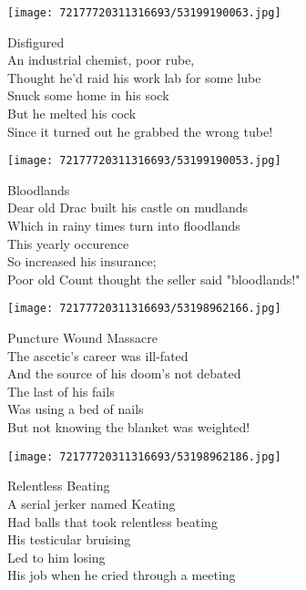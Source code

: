 \documentclass[10pt,letterpaper]{article}
\begin{document}
\begin{center}\texttt{[image: 72177720311316693/53199190063.jpg]}
\end{center}
\begin{center}
Disfigured\\
\vskip 0.2in
An industrial chemist, poor rube,\\
Thought he'd raid his work lab for some lube\\
Snuck some home in his sock\\
But he melted his cock\\
Since it turned out he grabbed the wrong tube!\\
\end{center}
\pagebreak

\begin{center}\texttt{[image: 72177720311316693/53199190053.jpg]}
\end{center}
\begin{center}
Bloodlands\\
\vskip 0.2in
Dear old Drac built his castle on mudlands\\
Which in rainy times turn into floodlands\\
This yearly occurence\\
So increased his insurance;\\
Poor old Count thought the seller said "bloodlands!"\\
\end{center}
\pagebreak

\begin{center}\texttt{[image: 72177720311316693/53198962166.jpg]}
\end{center}
\begin{center}
Puncture Wound Massacre\\
\vskip 0.2in
The ascetic's career was ill-fated\\
And the source of his doom's not debated\\
The last of his fails\\
Was using a bed of nails\\
But not knowing the blanket was weighted!\\
\end{center}
\pagebreak

\begin{center}\texttt{[image: 72177720311316693/53198962186.jpg]}
\end{center}
\begin{center}
Relentless Beating\\
\vskip 0.2in
A serial jerker named Keating\\
Had balls that took relentless beating\\
His testicular bruising\\
Led to him losing\\
His job when he cried through a meeting\\
\end{center}
\pagebreak
\end{document}
